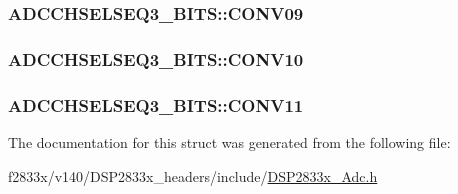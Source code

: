 \subsubsection[{C\+O\+N\+V09}]{ A\+D\+C\+C\+H\+S\+E\+L\+S\+E\+Q3\+\_\+\+B\+I\+T\+S\+::\+C\+O\+N\+V09}\label{struct_a_d_c_c_h_s_e_l_s_e_q3___b_i_t_s_a97ad10432326ae7a6204f76ed82f481c}
\hypertarget{struct_a_d_c_c_h_s_e_l_s_e_q3___b_i_t_s_aed8e30907dd488b82f3af1018c3a21c1}{}
\subsubsection[{C\+O\+N\+V10}]{ A\+D\+C\+C\+H\+S\+E\+L\+S\+E\+Q3\+\_\+\+B\+I\+T\+S\+::\+C\+O\+N\+V10}\label{struct_a_d_c_c_h_s_e_l_s_e_q3___b_i_t_s_aed8e30907dd488b82f3af1018c3a21c1}
\hypertarget{struct_a_d_c_c_h_s_e_l_s_e_q3___b_i_t_s_aa4c833d68f47e6ce682d94a1287ef9c6}{}
\subsubsection[{C\+O\+N\+V11}]{ A\+D\+C\+C\+H\+S\+E\+L\+S\+E\+Q3\+\_\+\+B\+I\+T\+S\+::\+C\+O\+N\+V11}\label{struct_a_d_c_c_h_s_e_l_s_e_q3___b_i_t_s_aa4c833d68f47e6ce682d94a1287ef9c6}


The documentation for this struct was generated from the following file\+:\begin{DoxyCompactItemize}
\item 
f2833x/v140/\+D\+S\+P2833x\+\_\+headers/include/\hyperlink{_d_s_p2833x___adc_8h}{D\+S\+P2833x\+\_\+\+Adc.\+h}\end{DoxyCompactItemize}
